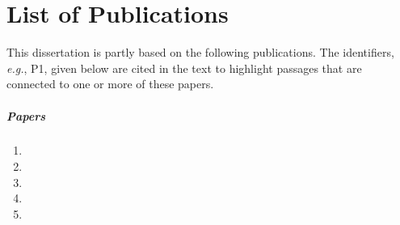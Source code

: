
\chapter*{List of Publications}

This dissertation is partly based on the following publications. The identifiers, \textit{e.g.}, P1, given below are cited in the text to highlight passages that are connected to one or more of these papers.

\paragraph{Papers}
\begin{enumerate}[P1]
    \item {}
    \item {}
    \item {}
    \item {}
    \item {}

\end{enumerate}

%
